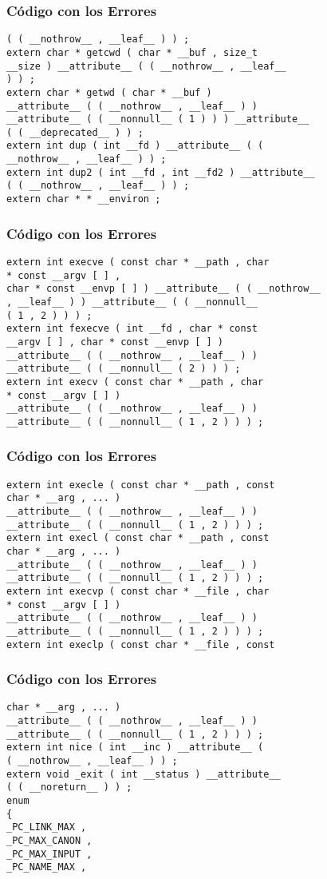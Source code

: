 \documentclass{beamer}
\begin{document}
\begin{frame}[fragile]
\frametitle{C\'odigo con los Errores}
\begin{verbatim}
( ( __nothrow__ , __leaf__ ) ) ; 
extern char * getcwd ( char * __buf , size_t 
__size ) __attribute__ ( ( __nothrow__ , __leaf__ 
) ) ; 
extern char * getwd ( char * __buf ) 
__attribute__ ( ( __nothrow__ , __leaf__ ) ) 
__attribute__ ( ( __nonnull__ ( 1 ) ) ) __attribute__ 
( ( __deprecated__ ) ) ; 
extern int dup ( int __fd ) __attribute__ ( ( 
__nothrow__ , __leaf__ ) ) ; 
extern int dup2 ( int __fd , int __fd2 ) __attribute__ 
( ( __nothrow__ , __leaf__ ) ) ; 
extern char * * __environ ; 
\end{verbatim}
\end{frame}
\begin{frame}[fragile]
\frametitle{C\'odigo con los Errores}
\begin{verbatim}
extern int execve ( const char * __path , char 
* const __argv [ ] , 
char * const __envp [ ] ) __attribute__ ( ( __nothrow__ 
, __leaf__ ) ) __attribute__ ( ( __nonnull__ 
( 1 , 2 ) ) ) ; 
extern int fexecve ( int __fd , char * const 
__argv [ ] , char * const __envp [ ] ) 
__attribute__ ( ( __nothrow__ , __leaf__ ) ) 
__attribute__ ( ( __nonnull__ ( 2 ) ) ) ; 
extern int execv ( const char * __path , char 
* const __argv [ ] ) 
__attribute__ ( ( __nothrow__ , __leaf__ ) ) 
__attribute__ ( ( __nonnull__ ( 1 , 2 ) ) ) ; 
\end{verbatim}
\end{frame}
\begin{frame}[fragile]
\frametitle{C\'odigo con los Errores}
\begin{verbatim}
extern int execle ( const char * __path , const 
char * __arg , ... ) 
__attribute__ ( ( __nothrow__ , __leaf__ ) ) 
__attribute__ ( ( __nonnull__ ( 1 , 2 ) ) ) ; 
extern int execl ( const char * __path , const 
char * __arg , ... ) 
__attribute__ ( ( __nothrow__ , __leaf__ ) ) 
__attribute__ ( ( __nonnull__ ( 1 , 2 ) ) ) ; 
extern int execvp ( const char * __file , char 
* const __argv [ ] ) 
__attribute__ ( ( __nothrow__ , __leaf__ ) ) 
__attribute__ ( ( __nonnull__ ( 1 , 2 ) ) ) ; 
extern int execlp ( const char * __file , const 
\end{verbatim}
\end{frame}
\begin{frame}[fragile]
\frametitle{C\'odigo con los Errores}
\begin{verbatim}
char * __arg , ... ) 
__attribute__ ( ( __nothrow__ , __leaf__ ) ) 
__attribute__ ( ( __nonnull__ ( 1 , 2 ) ) ) ; 
extern int nice ( int __inc ) __attribute__ ( 
( __nothrow__ , __leaf__ ) ) ; 
extern void _exit ( int __status ) __attribute__ 
( ( __noreturn__ ) ) ; 
enum 
{ 
_PC_LINK_MAX , 
_PC_MAX_CANON , 
_PC_MAX_INPUT , 
_PC_NAME_MAX , 
\end{verbatim}
\end{frame}
\end{document}
